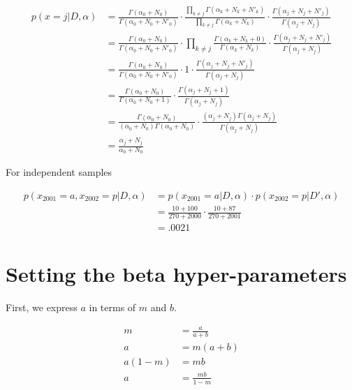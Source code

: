 \documentclass{article}
\begin{document}
\begin{align*}
  p(x=j|D,\alpha) &= \frac{\Gamma(\alpha_0 + N_0)}{\Gamma(\alpha_0 + N_0 + N'_0)}
             \cdot \frac{\prod_{k \neq j} \Gamma(\alpha_k + N_k +
             N'_k)}{\prod_{k \neq j} \Gamma(\alpha_k + N_k)} \cdot
             \frac{\Gamma(\alpha_j + N_j + N'_j)}{\Gamma(\alpha_j +
             N_j)} \\
           &= \frac{\Gamma(\alpha_0 + N_0)}{\Gamma(\alpha_0 + N_0 + N'_0)}
             \cdot \prod_{k \neq j} \frac{\Gamma(\alpha_k + N_k +
             0)}{\Gamma(\alpha_k + N_k)} \cdot \frac{\Gamma(\alpha_j +
             N_j + N'_j)}{\Gamma(\alpha_j + N_j)} \\
           &= \frac{\Gamma(\alpha_0 + N_0)}{\Gamma(\alpha_0 + N_0 + N'_0)}
             \cdot 1 \cdot \frac{\Gamma(\alpha_j +
             N_j + N'_j)}{\Gamma(\alpha_j + N_j)} \\
           &= \frac{\Gamma(\alpha_0 + N_0)}{\Gamma(\alpha_0 + N_0 + 1)}
             \cdot \frac{\Gamma(\alpha_j +
             N_j + 1)}{\Gamma(\alpha_j + N_j)} \\
           &= \frac{\Gamma(\alpha_0 + N_0)}{(\alpha_0 +
             N_0)\Gamma(\alpha_0 + N_0)} \cdot \frac{(\alpha_j +
             N_j)\Gamma(\alpha_j + N_j)}{\Gamma(\alpha_j + N_j)} \\
           &= \frac{\alpha_j + N_j}{\alpha_0 + N_0}
\end{align*}

For independent samples

\begin{align*}
  p(x_{2001}=a, x_{2002}=p|D,\alpha) &= p(x_{2001}=a|D,\alpha)
                                           \cdot
                                           p(x_{2002}=p|D',\alpha)
  \\
                                         &= \frac{10 + 100}{270 +
                                           2000} \cdot \frac{10 +
                                           87}{270 + 2001} \\
                                         &= .0021
\end{align*}

\section{Setting the beta hyper-parameters}

First, we express $a$ in terms of $m$ and $b$.

\begin{align*}
  m &= \frac{a}{a+b} \\
  a &= m(a + b)  \\
  a(1 - m) &= mb \\
  a &= \frac{mb}{1 - m}
\end{align*}
\end{document}
